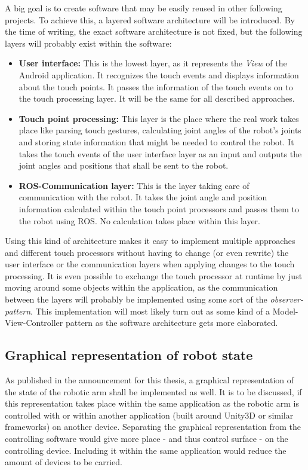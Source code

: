 \documentclass[a4paper]{article}
\begin{document}
A big goal is to create software that may be easily reused in other following projects. To achieve this, a layered software architecture will be introduced. By the time of writing, the exact software architecture is not fixed, but the following layers will probably exist within the software:
\begin{itemize}
	\item \textbf{User interface:} This is the lowest layer, as it represents the \textit{View} of the Android application. It recognizes the touch events and displays information about the touch points. It passes the information of the touch events on to the touch processing layer. It will be the same for all described approaches.
	\item \textbf{Touch point processing:} This layer is the place where the real work takes place like parsing touch gestures, calculating joint angles of the robot's joints and storing state information that might be needed to control the robot. It takes the touch events of the user interface layer as an input and outputs the joint angles and positions that shall be sent to the robot.
	\item \textbf{ROS-Communication layer:} This is the layer taking care of communication with the robot. It takes the joint angle and position information calculated within the touch point processors and passes them to the robot using ROS. No calculation takes place within this layer.
\end{itemize}

Using this kind of architecture makes it easy to implement multiple approaches and different touch processors without having to change (or even rewrite) the user interface or the communication layers when applying changes to the touch processing. It is even possible to exchange the touch processor at runtime by just moving around some objects within the application, as the communication between the layers will probably be implemented using some sort of the \textit{observer-pattern}. This implementation will most likely turn out as some kind of a Model-View-Controller pattern as the software architecture gets more elaborated.

\subsection{Graphical representation of robot state}

As published in the announcement for this thesis, a graphical representation of the state of the robotic arm shall be implemented as well. It is to be discussed, if this representation takes place within the same application as the robotic arm is controlled with or within another application (built around Unity3D or similar frameworks) on another device. Separating the graphical representation from the controlling software would give more place - and thus control surface - on the controlling device. Including it within the same application would reduce the amount of devices to be carried.
\end{document}
